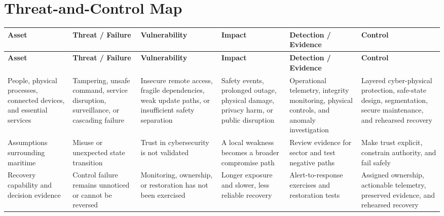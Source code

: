 \documentclass[11pt,letterpaper]{article}
\begin{document}
\section*{Threat-and-Control Map}
\begingroup\scriptsize\setlength{\tabcolsep}{2pt}
\begin{longtable}{>{\raggedright\arraybackslash}p{}>{\raggedright\arraybackslash}p{}>{\raggedright\arraybackslash}p{}>{\raggedright\arraybackslash}p{}>{\raggedright\arraybackslash}p{}>{\raggedright\arraybackslash}p{}}
\toprule\rowcolor{Navy}\color{white}\textbf{Asset} & \color{white}\textbf{Threat / Failure} & \color{white}\textbf{Vulnerability} & \color{white}\textbf{Impact} & \color{white}\textbf{Detection / Evidence} & \color{white}\textbf{Control}\\\midrule
\endfirsthead
\toprule\rowcolor{Navy}\color{white}\textbf{Asset} & \color{white}\textbf{Threat / Failure} & \color{white}\textbf{Vulnerability} & \color{white}\textbf{Impact} & \color{white}\textbf{Detection / Evidence} & \color{white}\textbf{Control}\\\midrule
\endhead
People, physical processes, connected devices, and essential services & Tampering, unsafe command, service disruption, surveillance, or cascading failure & Insecure remote access, fragile dependencies, weak update paths, or insufficient safety separation & Safety events, prolonged outage, physical damage, privacy harm, or public disruption & Operational telemetry, integrity monitoring, physical controls, and anomaly investigation & Layered cyber-physical protection, safe-state design, segmentation, secure maintenance, and rehearsed recovery\\\midrule
Assumptions surrounding maritime & Misuse or unexpected state transition & Trust in cybersecurity is not validated & A local weakness becomes a broader compromise path & Review evidence for sector and test negative paths & Make trust explicit, constrain authority, and fail safely\\\midrule
Recovery capability and decision evidence & Control failure remains unnoticed or cannot be reversed & Monitoring, ownership, or restoration has not been exercised & Longer exposure and slower, less reliable recovery & Alert-to-response exercises and restoration tests & Assigned ownership, actionable telemetry, preserved evidence, and rehearsed recovery\\\midrule
\bottomrule
\end{longtable}
\endgroup
\end{document}
